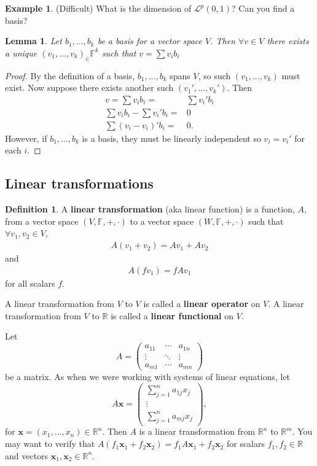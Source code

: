 \documentclass[12pt,reqno]{amsart}
\def\F{\mathbb{F}}
\def\R{\mathbb{R}}
\newcommand{\gmatrix}[1]{\begin{pmatrix} {#1}_{11} & \cdots &
    {#1}_{1n} \\ \vdots & \ddots & \vdots \\ {#1}_{m1} & \cdots &
    {#1}_{mn} \end{pmatrix}}
\newtheorem{lemma}{Lemma}[section]
\theoremstyle{definition}
\newtheorem{definition}{Definition}[section]
\newtheorem{example}{Example}[section]
\begin{document}
\begin{example} 
  (Difficult) What is the dimension of $\mathcal{L}^p(0,1)$? Can you find a basis? 
\end{example}

\begin{lemma}
  Let $b_1, ... , b_k$ be a basis for a vector space $V$. Then
  $\forall v \in V$ there exists a unique $(v_1, ..., v_k)_ \in \F^k$
  such that $ v = \sum v_i b_i$  
\end{lemma}
\begin{proof}
  By the definition of a basis, $b_1, ..., b_k$ spans $V$, so such
  $(v_1, ..., v_k)$ must exist. Now suppose there exists another such
  $(v_1', ..., v_k')$. Then
  \begin{align*}
    v = \sum v_i b_i = & \sum v_i' b_i \\
    \sum v_i b_i - \sum v_i'b_i = & 0 \\
    \sum (v_i - v_i)' b_i = & 0.
  \end{align*}
  However, if $b_1,..., b_k$ is a basis, they must be linearly
  independent so $v_i = v_i'$ for each $i$.
\end{proof}

\subsection{Linear transformations}

\begin{definition}
  A \textbf{linear transformation} (aka linear function) is a
  function, $A$, from a vector space $(V,\F,+,\cdot)$ to a vector
  space $(W,\F,+,\cdot)$ such that $\forall v_1, v_2 \in V$,
  \begin{align*}
    A (v_1 + v_2) = A v_1 + A v_2 
  \end{align*}
  and 
  \begin{align*}
    A (f v_1) = f A v_1
  \end{align*}
  for all scalars $f$.   

  A linear transformation from $V$ to $V$ is called a \textbf{linear
    operator} on $V$. A linear transformation from $V$ to $\R$ is
  called a \textbf{linear functional} on $V$.
\end{definition}
Let 
\[ A = \gmatrix{a} \]
be a matrix. As when we were working with systems of linear equations,
let 
\[ A\mathbf{x} = 
\begin{pmatrix} 
  \sum_{j=1}^n a_{1j} x_j \\
  \vdots \\
  \sum_{j=1}^n a_{mj} x_j 
\end{pmatrix}, \] for $\mathbf{x} = (x_1, ..., x_n) \in \R^n$. Then
$A$ is a linear transformation from $\R^n$ to $\R^m$. You may want to
verify that $A(f_1 \mathbf{x}_1 + f_2 \mathbf{x}_2 ) = f_1 A
\mathbf{x}_1 + f_2 \mathbf{x}_2$ for scalars $f_1, f_2 \in \R$ and
vectors $\mathbf{x}_1, \mathbf{x}_2 \in \R^n$.
\end{document}
